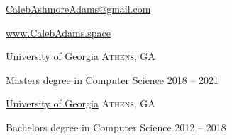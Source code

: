 \documentclass[10pt,a4paper]{article}
\begin{document}
\sloppy  %



\nobreakvspace{0.6em}  %

\href{mailto:CalebAshmoreAdams@gmail.com}{CalebAshmoreAdams\mbox{}@\mbox{}gmail.com}

\href{http://calebadams.space}{www.CalebAdams.space}
\\

\spacedhrule{0.5em}{-0.4em}
\spacedhrule{0.5em}{-0.4em}


\headedsection
  {\href{http://uga.edu}{University of Georgia}}
  {\textsc{Athens, GA}} {%
  \headedsubsection
    {Masters degree in Computer Science}
    {2018 -- 2021}
    {\bodytext{}}

  }
\headedsection
  {\href{http://uga.edu}{University of Georgia}}
  {\textsc{Athens, GA}} {%
  \headedsubsection
    {Bachelors degree in Computer Science}
    {2012 -- 2018}
    {\bodytext{}}

  }



\spacedhrule{0em}{-0.4em}
\end{document}
